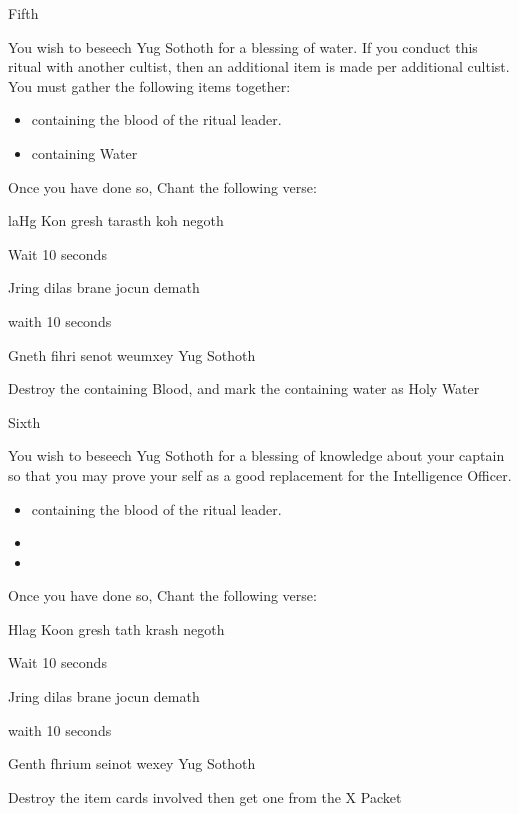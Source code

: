 \documentclass[greennotebook]{guildcamp4} %
\begin{document}
	\begin{page}{Fifth}
		
		You wish to beseech Yug Sothoth for a blessing of water. If you conduct this ritual with another cultist, then an additional item is made per additional cultist. You must gather the following items together: 
		
		\begin{itemize}
			\item \iTestTube{} containing the blood of the ritual leader.
			\item \iTestTube{} containing Water
		\end{itemize}
		
		Once you have done so, Chant the following verse:
		
		laHg Kon gresh tarasth koh negoth
		
		Wait 10 seconds
		
		Jring dilas brane jocun demath
		
		waith 10 seconds
		
		Gneth fihri senot weumxey Yug Sothoth
		
		Destroy the \iTestTube{} containing Blood, and mark the \iTestTube{} containing water as Holy Water
		
		
	\end{page}
	
	\begin{page}{Sixth}
		
		
		You wish to beseech Yug Sothoth for a blessing of knowledge about your captain so that you may prove your self as a good replacement for the Intelligence Officer.  
		
		\begin{itemize}
			\item \iTestTube{} containing the blood of the ritual leader.
			\item \iGlassLens{}
			\item \iScrapMetal{}
		\end{itemize}
		
		Once you have done so, Chant the following verse:
		
		Hlag Koon gresh tath krash negoth
		
		Wait 10 seconds
		
		Jring dilas brane jocun demath
		
		waith 10 seconds
		
		Genth fhrium seinot wexey Yug Sothoth	
		
		Destroy the item cards involved then get one \iBlackMailD{} from the X Packet
		
		
	\end{page}

	
	\endnotebook
	
\end{document}
